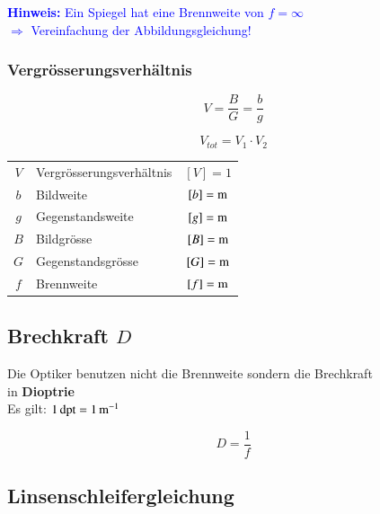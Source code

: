 \textcolor{blue}{ \textbf{Hinweis:} Ein Spiegel hat eine Brennweite von $f = \infty$ \\
$\Rightarrow$ Vereinfachung der Abbildungsgleichung!}


\subsubsection{Vergrösserungsverhältnis}

\begin{minipage}{0.48\linewidth}
$$ \boxed{ V = \frac{B}{G} = \frac{b}{g} } $$
\end{minipage}
\hfill
\begin{minipage}{0.48\linewidth}
$$ \boxed{ V_{tot} = V_1 \cdot V_2 } $$ 
\end{minipage}

\vspace{0.2cm}



\begin{tabular}{c l c}
	$V$ & Vergrösserungsverhältnis & $[V] = 1$ \\
	$b$ & Bildweite & $[b] = \mathrm{m}$ \\
	$g$ & Gegenstandsweite & $[g] = \mathrm{m}$ \\
	$B$ & Bildgrösse & $[B] = \mathrm{m}$ \\
	$G$ & Gegenstandsgrösse & $[G] = \mathrm{m}$ \\
	$f$ & Brennweite & $[f] = \mathrm{m}$ 
\end{tabular}




\subsection{Brechkraft $D$}
Die Optiker benutzen nicht die Brennweite sondern die Brechkraft \\
in \textbf{Dioptrie}  \\
Es gilt: $1 \, \mathrm{dpt} = 1 \, \mathrm{m}^{-1}$

$$ \boxed{ D = \frac{1}{f} }$$




\subsection{Linsenschleifergleichung}

